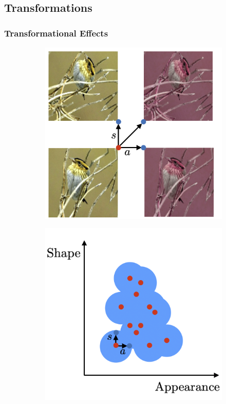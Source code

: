 	\subsection{Transformations}
		\begin{frame}[t]
		\frametitle{Transformational Effects}
			\begin{figure}[htp]
				\begin{subfigure}{0.40\linewidth}
					\centering
					\includegraphics[trim={0cm 0cm 0cm 0cm},clip, width=1.\linewidth]{fig/other/trans}
					\caption{}
				\end{subfigure}
				\begin{subfigure}{0.40\linewidth}
					\centering
					\includegraphics[trim={0cm 0cm 0cm 0cm},clip, width=1.\linewidth]{fig/other/trans2}

\end{subfigure}
\end{figure}
\end{frame}
